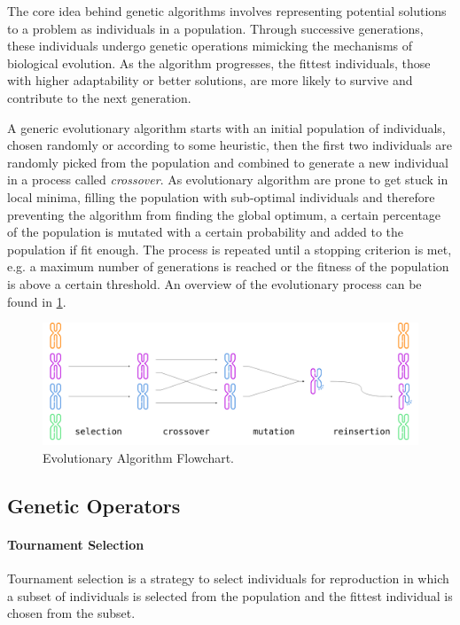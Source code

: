 The core idea behind genetic algorithms involves representing potential solutions to a problem as individuals in a population. Through successive generations, these individuals undergo genetic operations mimicking the mechanisms of biological evolution. As the algorithm progresses, the fittest individuals, those with higher adaptability or better solutions, are more likely to survive and contribute to the next generation.

A generic evolutionary algorithm starts with an initial population of individuals, chosen randomly or according to some heuristic, then the first two individuals are randomly picked from the population and combined to generate a new individual in a process called \textit{crossover}. As evolutionary algorithm are prone to get stuck in local minima, filling the population with sub-optimal individuals and therefore preventing the algorithm from finding the global optimum, a certain percentage of the population is  mutated with a certain probability and added to the population if fit enough. The process is repeated until a stopping criterion is met, e.g. a maximum number of generations is reached or the fitness of the population is above a certain threshold. An overview of the evolutionary process can be found in \cref{fig:genetic_algo}.

\begin{figure}
    \centering
    \caption{Evolutionary Algorithm Flowchart.}
    \label{fig:genetic_algo}
    \includegraphics[width=.9\textwidth]{Images/genetic_algo.png}
\end{figure}

\subsection{Genetic Operators}

\paragraph{Tournament Selection}

Tournament selection is a strategy to select individuals for reproduction in which a subset of individuals is selected from the population and the fittest individual is chosen from the subset.

